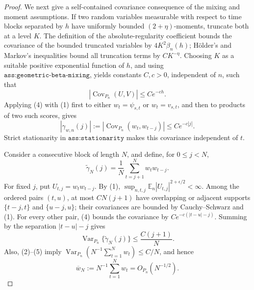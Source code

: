 \documentclass{article}
\begin{document}
\begin{proof}
We next give a self-contained covariance consequence of the mixing and moment assumptions.  If two random variables measurable with respect to time blocks separated by \(h\) have uniformly bounded \((2+\eta)\)-moments, truncate both at a level \(K\).  The definition of the absolute-regularity coefficient bounds the covariance of the bounded truncated variables by \(4K^2\beta_n(h)\); H\"older's and Markov's inequalities bound all truncation terms by \(CK^{-\eta}\).  Choosing \(K\) as a suitable positive exponential function of \(h\), and using \(\texttt{ass:geometric-beta-mixing}\), yields constants \(C,c>0\), independent of \(n\), such that
\[
 |\operatorname{Cov}_{P_n}(U,V)|\leq Ce^{-ch}.                                      \tag{4}
\]
Applying (4) with (1) first to either \(w_t=\psi_{s,t}\) or \(w_t=v_{s,t}\), and then to products of two such scores, gives
\[
 |\gamma_{w,n}(j)|
 :=|\operatorname{Cov}_{P_n}(w_t,w_{t-j})|\leq Ce^{-c|j|}.                           \tag{5}
\]
Strict stationarity in \(\texttt{ass:stationarity}\) makes this covariance independent of \(t\).

Consider a consecutive block of length \(N\), and define, for \(0\leq j<N\),
\[
 \widetilde\gamma_N(j)=\frac1N\sum_{t=j+1}^{N}w_tw_{t-j}.
\]
For fixed \(j\), put \(U_{t,j}=w_tw_{t-j}\).  By (1), \(\sup_{n,t,j}\mathbb E_n|U_{t,j}|^{2+\epsilon/2}<\infty\).  Among the ordered pairs \((t,u)\), at most \(C N(j+1)\) have overlapping or adjacent supports \(\{t-j,t\}\) and \(\{u-j,u\}\); their covariances are bounded by Cauchy--Schwarz and (1).  For every other pair, (4) bounds the covariance by \(Ce^{-c(|t-u|-j)}\).  Summing by the separation \(|t-u|-j\) gives
\[
 \operatorname{Var}_{P_n}\{\widetilde\gamma_N(j)\}
 \leq \frac{C(j+1)}{N}.                                                             \tag{6}
\]
Also, (2)--(5) imply \(\operatorname{Var}_{P_n}(N^{-1}\sum_{t=1}^Nw_t)\leq C/N\), and hence
\[
 \overline w_N:=N^{-1}\sum_{t=1}^Nw_t=O_{P_n}(N^{-1/2}).                            \tag{7}
\]


\end{proof}
\end{document}
